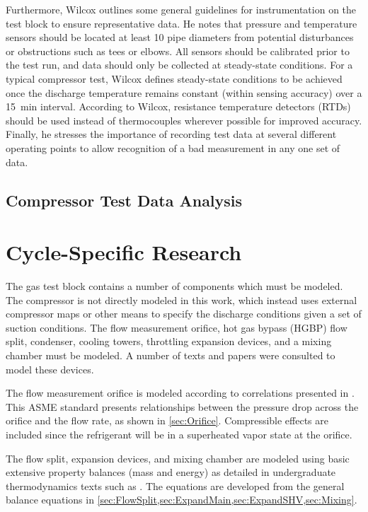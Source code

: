 Furthermore, Wilcox outlines some general guidelines 
for instrumentation on the test block to ensure representative data.  
He notes that pressure and temperature sensors should be located 
at least 10 pipe diameters from potential disturbances or obstructions such as tees or elbows.  
All sensors should be calibrated prior to the test run, 
and data should only be collected at steady-state conditions.  
For a typical compressor test, Wilcox defines steady-state conditions to be achieved 
once the discharge temperature remains constant (within sensing accuracy) over a \SI{15}{\minute} interval. 
According to Wilcox, resistance temperature detectors (RTDs)%
should be used instead of thermocouples wherever possible for improved accuracy. 
Finally, he stresses the importance of recording test data at several different operating points 
to allow recognition of a bad measurement in any one set of data.

\subsection{Compressor Test Data Analysis}

\section{Cycle-Specific Research}
The  gas test block contains a number of components which must be modeled. 
The compressor is not directly modeled in this work, 
which instead uses external compressor maps or other means 
to specify the discharge conditions given a set of suction conditions. 
The flow measurement orifice, hot gas bypass (HGBP)%
 flow split, condenser, cooling towers, 
throttling expansion devices, and a mixing chamber must be modeled. 
A number of texts and papers were consulted to model these devices.

The flow measurement orifice is modeled according to correlations presented in \citet{ptc19}. 
This ASME standard presents relationships between 
the pressure drop across the orifice and the flow rate, as shown in \cref{sec:Orifice}. 
Compressible effects are included since the refrigerant will be in a 
superheated vapor state at the orifice.

The flow split, expansion devices, and mixing chamber are modeled using 
basic extensive property balances (mass and energy) as detailed in 
undergraduate thermodynamics texts such as \citet{cengel2011}. 
The equations are developed from the general balance equations 
in \cref{sec:FlowSplit,sec:ExpandMain,sec:ExpandSHV,sec:Mixing}.

